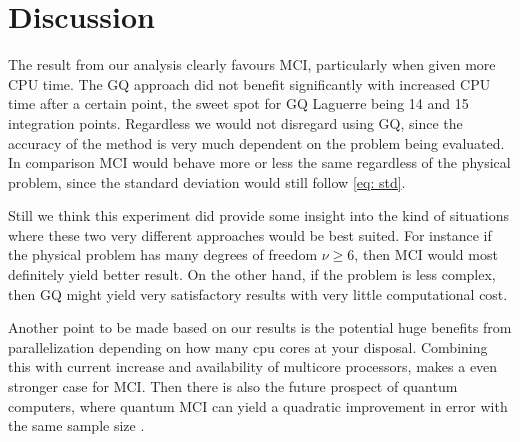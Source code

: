 \section{Discussion}
The result from our analysis clearly favours MCI, particularly when
given more CPU time. The GQ approach did not benefit significantly with
increased
CPU time after a certain point, the sweet spot for GQ Laguerre being 14 and 15
integration points. Regardless we would not disregard using GQ, since the
accuracy of the method is very much dependent on the problem being evaluated.
In comparison MCI would behave more or less the same regardless of the physical
problem, since the standard deviation would still follow \cref{eq: std}.

Still we think this experiment did provide some insight into the kind of
situations where
these two very different approaches would be best suited. For instance if the
physical problem has many degrees of freedom $\nu \ge 6 $, then MCI would most
definitely yield better result. On the other hand, if the problem is less complex,
then GQ might yield very satisfactory results with very little computational cost.

Another point to be made based on our results is the potential huge benefits
from parallelization depending on how many cpu cores at your disposal. Combining
this with current increase and availability of multicore processors, makes a
even stronger case for MCI.
Then there is also the future prospect of quantum
computers, where quantum MCI can yield a quadratic improvement in error with
the same sample size \parencite{doi:10.1098/rspa.2015.0301}.
